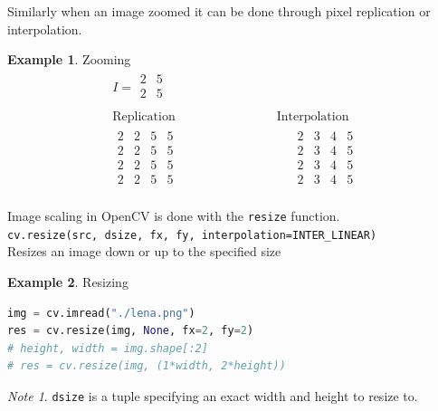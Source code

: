 \documentclass{article}
\theoremstyle{definition}
\newtheorem{ex}{Example}[subsection]
\theoremstyle{remark}
\newtheorem*{nb}{Note}
\newcommand{\func}[2]{\noindent\lstinline{#1}\\#2}
\begin{document}
\noindent Similarly when an image zoomed it can be done through pixel replication or interpolation.

\begin{ex} Zooming
\begin{gather*}
    I = \begin{matrix}
	2 & 5 \\
	2 & 5 \\
    \end{matrix} \\
    \text{Replication} 
    \qquad \qquad \qquad \qquad
    \text{Interpolation} \\
    \begin{matrix}
	2 & 2 & 5 & 5 \\
	2 & 2 & 5 & 5 \\
	2 & 2 & 5 & 5 \\
	2 & 2 & 5 & 5 \\
    \end{matrix} 
    \qquad \qquad \qquad \qquad \quad
    \begin{matrix}
	2 & 3 & 4 & 5 \\
	2 & 3 & 4 & 5 \\
	2 & 3 & 4 & 5 \\
	2 & 3 & 4 & 5 \\
    \end{matrix} 
\end{gather*}
\end{ex}

\noindent Image scaling in OpenCV is done with the \lstinline{resize} function.\\

\func{cv.resize(src, dsize, fx, fy, interpolation=INTER_LINEAR)}{Resizes an image down or up to the specified size}

\begin{ex} Resizing
\begin{lstlisting}[language=Python]
img = cv.imread("./lena.png")
res = cv.resize(img, None, fx=2, fy=2)
# height, width = img.shape[:2]
# res = cv.resize(img, (1*width, 2*height))
\end{lstlisting}

\begin{nb}
    \lstinline{dsize} is a tuple specifying an exact width and height to resize to.
\end{nb}
\end{ex}
\end{document}
